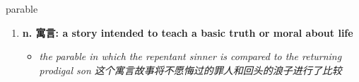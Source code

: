 
\begin{frame}
{\huge parable}
\begin{center}
\begin{enumerate}\Large
  \item \textbf{n. 寓言: a story intended to teach a basic truth or moral about life}
  \begin{itemize}
    \item \em{\Large{the parable in which the repentant sinner is compared to the returning prodigal son 这个寓言故事将不愿悔过的罪人和回头的浪子进行了比较}}
  \end{itemize}
\end{enumerate}
\end{center}
\end{frame}
